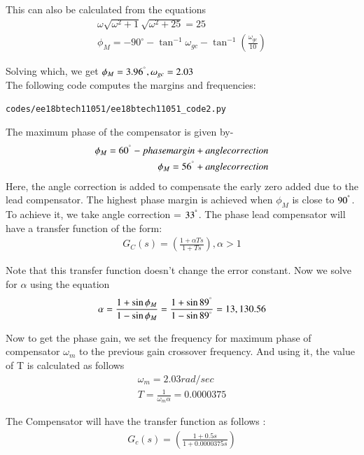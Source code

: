 This can also be calculated from the equations
\begin{align}
    \omega \sqrt{\omega^2 + 1} \sqrt{\omega^2 + 25} = 25\\
    \phi_{M} = -90^{\circ} - \tan^{-1}{\omega_{gc}} - \tan^{-1}({\frac{\omega_{gc}}{10}})
\end{align}

Solving which, we get $\phi_{M} =  3.96^{\degree} , \omega_{gc} =  2.03$\\
The following code computes the margins and frequencies:
\begin{lstlisting}
codes/ee18btech11051/ee18btech11051_code2.py
\end{lstlisting}

The maximum phase of the compensator is given by-
\begin{align}
    \phi_{M} = 60^{\degree} - phase margin + angle correction\\
    \phi_{M} = 56^{\degree} + angle correction
\end{align}
Here, the angle correction is added to compensate the early zero added due to the lead compensator. The highest phase margin is achieved when $\phi_{M}$ is close to $90^{\degree}$. To achieve it, we take angle correction = $33^{\degree}$.
The phase lead compensator will have a transfer function of the form:
\begin{align}
    G_{C}(s) = \left(\frac{1+\alpha Ts} {1+Ts}\right), \alpha >1
\end{align}


Note that this transfer function doesn't change the error constant.
Now we solve for $\alpha$ using the equation
\begin{align}
    \alpha = \frac{1+\sin{\phi_{M}}}{1-\sin{\phi_{M}}} = \frac{1+\sin{89^{\degree}}}{1-\sin{89^{\degree}}} = 13,130.56
\end{align}

Now to get the phase gain, we set the frequency for maximum phase of compensator $\omega_{m}$ to the previous gain crossover frequency. And using it, the value of T is calculated as follows
\begin{align}
    \omega_{m} = 2.03 rad/sec \\
    T = \frac{1}{\omega_{m}\alpha} = 0.0000375
\end{align}


The Compensator will have the transfer function as follows :
\begin{align}
G_{c}(s) = \left(\frac{1 + 0.5s}{1 + 0.0000375s}\right)
\end{align}

